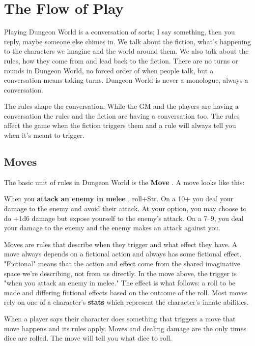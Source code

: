 \chapter{The Flow of Play}
   
 

Playing Dungeon World is a conversation of sorts; I say something, then you reply, maybe someone else chimes in. We talk about the fiction, what's happening to the characters we imagine and the world around them. We also talk about the rules, how they come from and lead back to the fiction. There are no turns or rounds in Dungeon World, no forced order of when people talk, but a conversation means taking turns. Dungeon World is never a monologue, always a conversation.

 

The rules shape the conversation. While the GM and the players are having a conversation the rules and the fiction are having a conversation too. The rules affect the game when the fiction triggers them and a rule will always tell you when it's meant to trigger.

 
\section{Moves}   
 

The basic unit of rules in Dungeon World is the {\bf Move} . A move looks like this:

 
\startExample
When you {\bf attack an enemy in melee} , roll+Str. On a 10+ you deal your damage to the enemy and avoid their attack. At your option, you may choose to do +1d6 damage but expose yourself to the enemy's attack. On a 7–9, you deal your damage to the enemy and the enemy makes an attack against you.
\stopExample
 

Moves are rules that describe when they trigger and what effect they have. A move always depends on a fictional action and always has some fictional effect. "Fictional" means that the action and effect come from the shared imaginative space we're describing, not from us directly. In the move above, the trigger is "when you attack an enemy in melee." The effect is what follows: a roll to be made and differing fictional effects based on the outcome of the roll. Most moves rely on one of a character's {\bf stats}  which represent the character's innate abilities.

 

When a player says their character does something that triggers a move that move happens and its rules apply. Moves and dealing damage are the only times dice are rolled. The move will tell you what dice to roll.


